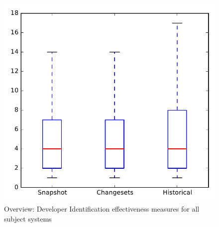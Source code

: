 
\begin{figure}
\centering
\includegraphics[height=0.4\textheight]{figures/dit/all_overview_no_outlier}
\caption{Overview: Developer Identification effectiveness measures for all subject systems}
\label{fig:dit:all:overview}
\end{figure}
